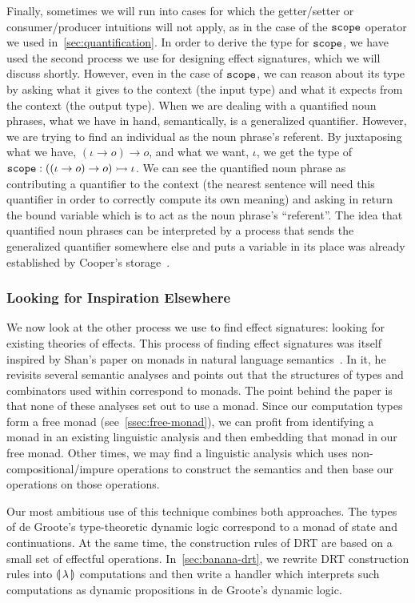 Finally, sometimes we will run into cases for which the getter/setter or
consumer/producer intuitions will not apply, as in the case of the
$\mathtt{scope}$ operator we used in~\ref{sec:quantification}. In order to
derive the type for $\mathtt{scope}$, we have used the second process we use
for designing effect signatures, which we will discuss shortly. However,
even in the case of $\mathtt{scope}$, we can reason about its type by asking
what it gives to the context (the input type) and what it expects from the
context (the output type). When we are dealing with a quantified noun
phrases, what we have in hand, semantically, is a generalized
quantifier. However, we are trying to find an individual as the noun
phrase's referent. By juxtaposing what we have, $(\iota \to o) \to o$, and
what we want, $\iota$, we get the type of
$\mathtt{scope} : ((\iota \to o) \to o) \rightarrowtail \iota$. We can see the quantified
noun phrase as contributing a quantifier to the context (the nearest
sentence will need this quantifier in order to correctly compute its own
meaning) and asking in return the bound variable which is to act as the
noun phrase's ``referent''. The idea that quantified noun phrases can be
interpreted by a process that sends the generalized quantifier somewhere
else and puts a variable in its place was already established by Cooper's
storage~\cite{cooper1979montague}.


\subsubsection{Looking for Inspiration Elsewhere}

We now look at the other process we use to find effect signatures: looking
for existing theories of effects. This process of finding effect signatures
was itself inspired by Shan's paper on monads in natural language
semantics~\cite{shan2002monads}. In it, he revisits several semantic
analyses and points out that the structures of types and combinators used
within correspond to monads. The point behind the paper is that none of
these analyses set out to use a monad. Since our computation types form a
free monad (see~\ref{ssec:free-monad}), we can profit from identifying a
monad in an existing linguistic analysis and then embedding that monad in
our free monad. Other times, we may find a linguistic analysis which uses
non-compositional/impure operations to construct the semantics and then
base our operations on those operations.

Our most ambitious use of this technique combines both approaches. The
types of de Groote's type-theoretic dynamic logic correspond to a monad of
state and continuations. At the same time, the construction rules of DRT
are based on a small set of effectful operations. In~\ref{sec:banana-drt},
we rewrite DRT construction rules into $\llparenthesis \, \lambda \, \rrparenthesis$ computations and
then write a handler which interprets such computations as dynamic
propositions in de Groote's dynamic logic.

